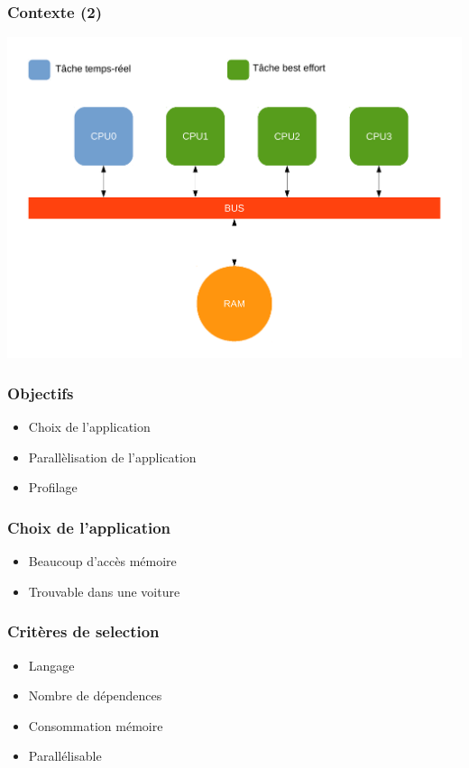 \begin{frame}
\frametitle{Contexte (2)}
\begin{center}
\includegraphics[scale=0.3]{include/archi.pdf}
\end{center}
\end{frame}

\begin{frame}
\frametitle{Objectifs}
\begin{itemize}
  \item Choix de l'application
  \item Parallèlisation de l'application
  \item Profilage
\end{itemize}
\end{frame}

\begin{frame}
\frametitle{Choix de l'application}
\begin{itemize}
  \item Beaucoup d'accès mémoire
  \item Trouvable dans une voiture
\end{itemize}
\end{frame}

\begin{frame}
\frametitle{Critères de selection}
\begin{itemize}
  \item Langage
  \item Nombre de dépendences
  \item Consommation mémoire
  \item Parallélisable
\end{itemize}
\end{frame}


